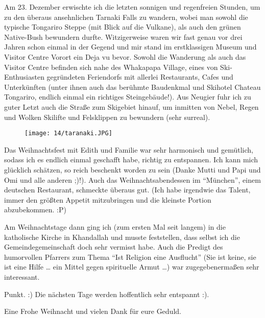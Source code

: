 Am 23. Dezember erwischte ich die letzten sonnigen und regenfreien
Stunden, um zu den überaus ansehnlichen Tarnaki Falls zu wandern, wobei
man sowohl die typische Tongariro Steppe (mit Blick auf die Vulkane),
als auch den grünen Native-Bush bewundern durfte. Witzigerweise waren
wir fast genau vor drei Jahren schon einmal in der Gegend und mir stand
im erstklassigen Museum und Visitor Centre Vorort ein Deja vu bevor.
Sowohl die Wanderung als auch das Visitor Centre befinden sich nahe des
Whakapapa Village, eines von Ski-Enthusiasten gegründeten Feriendorfs
mit allerlei Restaurants, Cafes und Unterkünften (unter ihnen auch das
berühmte Baudenkmal und Skihotel Chateau Tongariro, endlich einmal ein
richtiges Steingebäude!). Aus Neugier fuhr ich zu guter Letzt auch die
Straße zum Skigebiet hinauf, um inmitten von Nebel, Regen und Wolken
Skilifte und Felsklippen zu bewundern (sehr surreal).
\begin{figure}[p]
  \centering
  \texttt{[image: 14/taranaki.JPG]}
\end{figure}

Das Weihnachtsfest mit Edith und Familie war sehr harmonisch und
gemütlich, sodass ich es endlich einmal geschafft habe, richtig zu
entspannen. Ich kann mich glücklich schätzen, so reich beschenkt worden
zu sein (Danke Mutti und Papi und Omi und alle anderen ;)!). Auch das
Weihnachtsabendessen im ``München'', einem deutschen Restaurant, schmeckte
überaus gut. (Ich habe irgendwie das Talent, immer den größten Appetit
mitzubringen und die kleinste Portion abzubekommen. :P)

Am Weihnachtstage dann ging ich (zum ersten Mal seit langem) in die
katholische Kirche in Khandallah und musste feststellen, dass selbst ich
die Gemeindegemeinschaft doch sehr vermisst habe. Auch die Predigt des
humorvollen Pfarrers zum Thema ``Ist Religion eine Ausflucht'' (Sie ist
keine, sie ist eine Hilfe \ldots{} ein Mittel gegen spirituelle Armut
\ldots) war zugegebenermaßen sehr interessant.

Punkt. :) Die nächsten Tage werden hoffentlich sehr entspannt :).

Eine Frohe Weihnacht und vielen Dank für eure Geduld.
